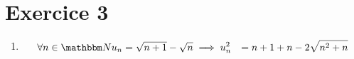 \part{Exercice 3}

\begin{enumerate}
	\item 
		\begin{align*}
			\forall n \in \N
			u_n = \sqrt{n+1} - \sqrt{n} &\implies u_n^2 &=  n + 1 + n - 2\sqrt{n^2+n} \\
		\end{align*}
\end{enumerate}
